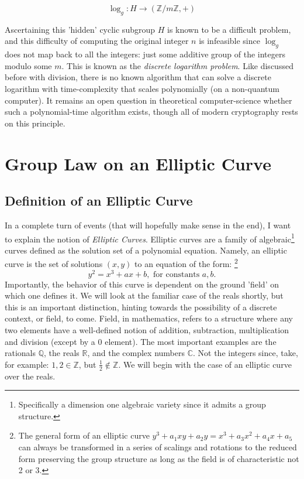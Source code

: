 \documentclass[11pt, a4paper]{report}
\newcommand{\integers}{\mathbb{Z}}
\newcommand{\rationals}{\mathbb{Q}}
\newcommand{\reals}{\mathbb{R}}
\newcommand{\complexes}{\mathbb{C}}
\begin{document}
\[ \log_g : H \rightarrow (\integers / m \integers, +) \]

Ascertaining this 'hidden' cyclic subgroup $H$ is known to be a difficult problem, and this difficulty of computing the original integer $n$ is infeasible since $\log_g$ does not map back to all the integers: just some additive group of the integers modulo some $m$. This is known as the \textit{discrete logarithm problem}.\autocite[97]{koblitz} Like discussed before with division, there is no known algorithm that can solve a discrete logarithm with time-complexity that scales polynomially (on a non-quantum computer). It remains an open question in theoretical computer-science whether such a polynomial-time algorithm exists, though all of  modern cryptography rests on this principle.


\section{Group Law on an Elliptic Curve}
\subsection{Definition of an Elliptic Curve}
In a complete turn of events (that will hopefully make sense in the end), I want to explain the notion of \textit{Elliptic Curves}. Elliptic curves are a family of  algebraic\footnote{Specifically a dimension one algebraic variety since it admits a group structure.} curves defined as the solution set of a polynomial equation. Namely, an elliptic curve is the set of solutions $(x,y)$ to an equation of the form:\autocite[10]{koblitz} \footnote{The general form of an elliptic curve $y^3 + a_1xy + a_2y = x^3 + a_3x^2 + a_4x + a_5$ can always be transformed in a series of scalings and rotations to the reduced form preserving the group structure as long as the field is of characteristic not 2 or 3.}
\[y^2 = x^3 + ax + b, \text{ for constants } a,b.\]
Importantly, the behavior of this curve is dependent on the ground 'field' on which one defines it. We will look at the familiar case of the reals shortly, but this is an important distinction, hinting towards the possibility of a discrete context, or field, to come. Field, in mathematics, refers to a structure where any two elements have a well-defined notion of addition, subtraction, multiplication and division (except by a 0 element). The most important examples are the rationals $\rationals$, the reals $\reals$, and the complex numbers $\complexes$. Not the integers since, take, for example: $1, 2 \in \integers$, but $\frac{1}{2} \notin \integers$. We will begin with the case of an elliptic curve over the reals.
\end{document}
